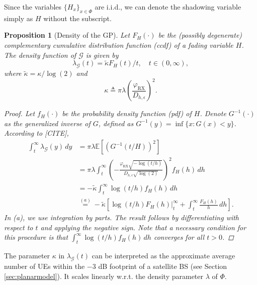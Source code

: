 \documentclass[lettersize,journal]{IEEEtran}
\newtheorem{prop}[theorem]{Proposition}
\begin{document}
Since the variables $\{H_x\}_{x \in \Phi}$ are i.i.d., we can denote the shadowing variable simply as $H$ without the subscript.
\begin{prop}[Density of the GP]
  Let $F_H(\cdot)$ be the (possibly degenerate) complementary cumulative distribution function (ccdf) of a fading variable $H$. The density function of $\mathcal{G}$ is given by
  \begin{equation}
    \label{eq:GPdensity}
    \lambda_{\mathcal{G}}(t) = \tilde{\kappa} {F_H(t)}/{t}, \quad t \in (0, \infty),
  \end{equation}
  where $\tilde{\kappa} = {\kappa}/{\log(2)}$ and
  \begin{equation}
    \label{eq:kappa}
    \kappa \triangleq \pi \lambda \left(\frac{\varphi_{\text{RX}}}{D_{h,\epsilon}}\right)^2.
  \end{equation}
  
  \begin{proof}
    Let $f_H(\cdot)$ be the probability density function (pdf) of $H$. Denote $G^{-1}(\cdot)$ as the generalized inverse of $G$, defined as $G^{-1}(y) = \inf \{x : G(x) < y\}$. According to [CITE],
    \begin{align*}
      \int_t^{\infty} \lambda_{\mathcal{G}}(y) \, dy &= \pi \lambda \mathbb{E}\left[ \left({G^{-1}(t/H)}{}\right)^2 \right] \\
      &= \pi \lambda \int_t^{\infty} \left(-\frac{\varphi_{\text{RX}} \sqrt{-\log(t/h)}}{D_{h,\epsilon} \sqrt{\log(2)}}\right)^2 f_H(h) \, dh \\
      &= -\tilde{\kappa} \int_t^{\infty} \log(t/h) f_H(h) \, dh \\
      &\overset{(a)}{=} -\tilde{\kappa} \left[ \left. \log(t/h) F_H(h) \right|_t^{\infty} + \int_t^{\infty} \frac{F_H(h)}{h} \, dh \right].
    \end{align*}
    In (a), we use integration by parts. The result follows by differentiating with respect to $t$ and applying the negative sign. Note that a necessary condition for this procedure is that $\int_t^{\infty} \log(t/h) f_H(h) \, dh$ converges for all $t > 0$.
  \end{proof}
\end{prop}


The parameter $\kappa$ in $\lambda_{\mathcal{G}}(t)$ can be interpreted as the approximate average number of UEs within the $-3$ dB footprint of a satellite BS (see Section \ref{sec:planarmodel}). It scales linearly w.r.t. the density parameter $\lambda$ of $\Phi$.
\end{document}
